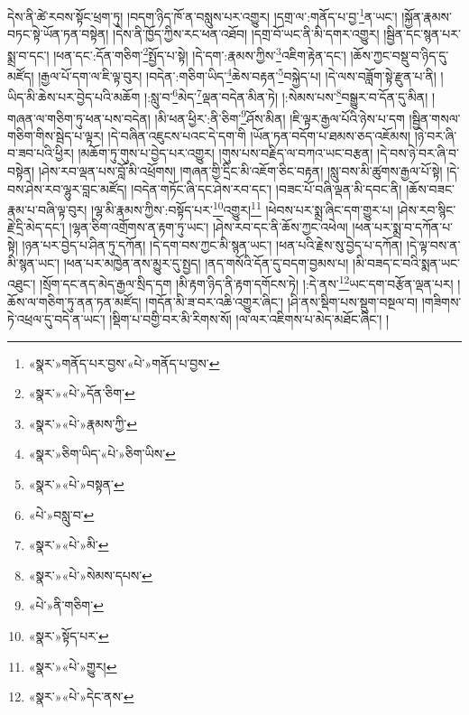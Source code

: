 དེས་ནི་ཚེ་རབས་སྟོང་ཕྲག་ཏུ། །བདག་ཉིད་ཁོ་ན་བསླུས་པར་འགྱུར། །དགྲ་ལ་:གནོད་པ་བྱ་\footnote{«སྣར་»གནོད་པར་བྱས་«པེ་»གནོད་པ་བྱས་}ན་ཡང་། །སྐྱོན་རྣམས་བཏང་སྟེ་ཡོན་ཏན་བསྟེན། །དེས་ནི་ཁྱོད་ཀྱིས་རང་ཕན་འཐོབ། །དགྲ་བོ་ཡང་ནི་མི་དགར་འགྱུར། །སྦྱིན་དང་སྙན་པར་སྨྲ་བ་དང་། །ཕན་དང་:དོན་གཅིག་\footnote{«སྣར་»«པེ་»དོན་ཅིག་}སྤྱོད་པ་སྟེ། །དེ་དག་:རྣམས་ཀྱིས་\footnote{«སྣར་»«པེ་»རྣམས་ཀྱི་}འཇིག་རྟེན་དང་། །ཆོས་ཀྱང་བསྡུ་བ་ཉིད་དུ་མཛོད། །རྒྱལ་པོ་དག་ལ་ཇི་ལྟ་བུར། །བདེན་:གཅིག་ཡིད་\footnote{«སྣར་»ཅིག་ཡིད་«པེ་»ཅིག་ཡིས་}ཆེས་བརྟན་\footnote{«སྣར་»«པེ་»བསྟན་}བསྐྱེད་པ། །དེ་ལས་བཟློག་སྟེ་རྫུན་པ་ནི། །ཡིད་མི་ཆེས་པར་བྱེད་པའི་མཆོག །:སླུ་བ་\footnote{«པེ་»བསླུ་བ་}མེད་\footnote{«སྣར་»«པེ་»མི་}ལྡན་བདེན་མིན་ཏེ། །:སེམས་པས་\footnote{«སྣར་»«པེ་»སེམས་དཔས་}བསྒྱུར་བ་དོན་དུ་མིན། །གཞན་ལ་གཅིག་ཏུ་ཕན་པས་བདེན། །མི་ཕན་ཕྱིར་:ནི་ཅིག་\footnote{«པེ་»ནི་གཅིག་}ཤོས་མིན། །ཇི་ལྟར་རྒྱལ་པོའི་ཉེས་པ་དག །སྦྱིན་གསལ་གཅིག་གིས་སྦེད་པ་ལྟར། །དེ་བཞིན་འཇུངས་པའང་དེ་དག་གི །ཡོན་ཏན་བདོག་པ་ཐམས་ཅད་འཇོམས། །ཉེ་བར་ཞི་བ་ཟབ་པའི་ཕྱིར། །མཆོག་ཏུ་གུས་པ་བྱེད་པར་འགྱུར། །གུས་པས་བརྗིད་ལ་བཀའ་ཡང་བརྩན། །དེ་བས་ཉེ་བར་ཞི་བ་བསྟེན། །ཤེས་རབ་ལྡན་པས་བློ་མི་འཕྲོགས། །གཞན་གྱི་དྲིང་མི་འཇོག་ཅིང་བརྟན། །སླུ་བས་མི་ཚུགས་རྒྱལ་པོ་སྟེ། །དེ་བས་ཤེས་རབ་ལྷུར་བླང་མཛོད། །བདེན་གཏོང་ཞི་དང་ཤེས་རབ་དང་། །བཟང་པོ་བཞི་ལྡན་མི་དབང་ནི། །ཆོས་བཟང་རྣམ་པ་བཞི་ལྟ་བུར། །ལྷ་མི་རྣམས་ཀྱིས་:བསྟོད་པར་\footnote{«སྣར་»སྟོད་པར་}འགྱུར།\footnote{«སྣར་»«པེ་»གྱུར།} །ཕེབས་པར་སྨྲ་ཞིང་དག་གྱུར་པ། །ཤེས་རབ་སྙིང་རྗེ་དྲི་མེད་དང་། །ལྷན་ཅིག་འགྲོགས་ན་རྟག་ཏུ་ཡང་། །ཤེས་རབ་དང་ནི་ཆོས་ཀྱང་འཕེལ། །ཕན་པར་སྨྲ་བ་དཀོན་པ་སྟེ། །ཉན་པར་བྱེད་པ་ཤིན་ཏུ་དཀོན། །དེ་དག་བས་ཀྱང་མི་སྙན་ཡང་། །ཕན་པའི་རྗེས་སུ་བྱེད་པ་དཀོན། །དེ་ལྟ་བས་ན་མི་སྙན་ཡང་། །ཕན་པར་མཁྱེན་ནས་མྱུར་དུ་སྤྱད། །ནད་གསོའི་དོན་དུ་བདག་བྱམས་པ། །མི་བཟད་ང་བའི་སྨན་ཡང་འཐུང་། །སྲོག་དང་ནད་མེད་རྒྱལ་སྲིད་དག །མི་རྟག་ཉིད་ནི་རྟག་དགོངས་ཏེ། །:དེ་ནས་\footnote{«སྣར་»«པེ་»དེང་ནས་}ཡང་དག་བརྩོན་ལྡན་པར། །ཆོས་ལ་གཅིག་ཏུ་ནན་ཏན་མཛོད། །གདོན་མི་ཟ་བར་འཆི་འགྱུར་ཞིང་། །ཤི་ནས་སྡིག་པས་སྡུག་བསྔལ་བ། །གཟིགས་ཏེ་འཕྲལ་དུ་བདེ་ན་ཡང་། །སྡིག་པ་བགྱི་བར་མི་རིགས་སོ། །ལ་ལར་འཇིགས་པ་མེད་མཐོང་ཞིང་། །
